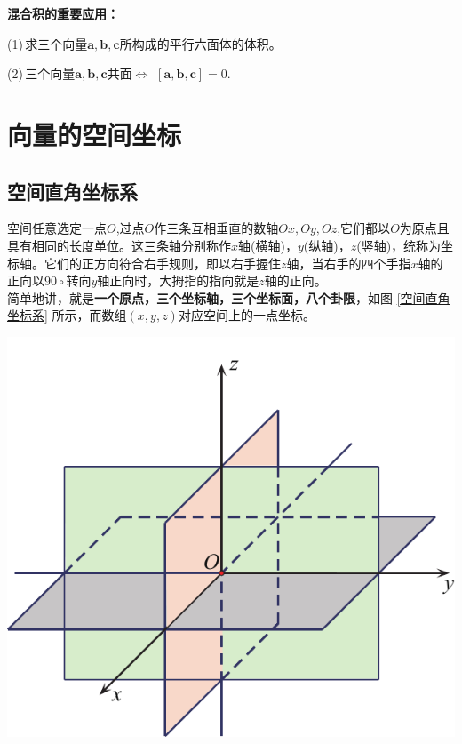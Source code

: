 \noindent\textbf{混合积的重要应用：}

(1)$\,$求三个向量$\boldsymbol{a},\boldsymbol{b},\boldsymbol{c}$所构成的平行六面体的体积。

(2)$\,$三个向量$\boldsymbol{a},\boldsymbol{b},\boldsymbol{c}$共面$\Leftrightarrow$ $[\boldsymbol{a},\boldsymbol{b},\boldsymbol{c}]=0$.

\section{向量的空间坐标}
\subsection{空间直角坐标系}
\vspace*{-0.5em}

\noindent
\begin{minipage}{0.55\linewidth}
\hspace*{2em}空间任意选定一点$O$,过点$O$作三条互相垂直的数轴$Ox,Oy,Oz$,它们都以$O$为原点且具有相同的长度单位。这三条轴分别称作$x$轴(横轴)，$y$(纵轴)，$z$(竖轴)，统称为坐标轴。它们的正方向符合右手规则，即以右手握住$z$轴，当右手的四个手指$x$轴的正向以$90\circ$转向$y$轴正向时，大拇指的指向就是$z$轴的正向。\\
\hspace*{2em} 简单地讲，就是\textbf{一个原点，三个坐标轴，三个坐标面，八个卦限}，如图 \ref{空间直角坐标系} 所示，而数组$(x,y,z)$对应空间上的一点坐标。
\end{minipage}
\begin{minipage}{0.45\linewidth}
	\centering
	\includegraphics[width = 0.8\linewidth]{pic/C-5/空间坐标}
	\vspace*{-1em}
	\label{空间直角坐标系}
\end{minipage}

